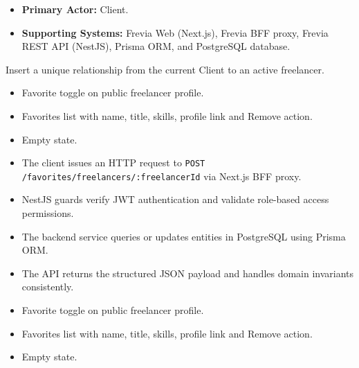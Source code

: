 
\begin{itemize}[leftmargin=1.6em,topsep=3pt,itemsep=2pt,parsep=0pt,label=$\bullet$]
    \item \textbf{Primary Actor:} Client.
    \item \textbf{Supporting Systems:} Frevia Web (Next.js), Frevia BFF proxy, Frevia REST API (NestJS), Prisma ORM, and PostgreSQL database.
\end{itemize}

\noindent Insert a unique relationship from the current Client to an active freelancer.

\begin{itemize}[leftmargin=1.6em,topsep=3pt,itemsep=2pt,parsep=0pt,label=$\bullet$]
    \item Favorite toggle on public freelancer profile.
    \item Favorites list with name, title, skills, profile link and Remove action.
    \item Empty state.
\end{itemize}

\begin{itemize}[leftmargin=1.6em,topsep=3pt,itemsep=2pt,parsep=0pt,label=$\bullet$]
    \item The client issues an HTTP request to \texttt{POST /\allowbreak{}favorites/\allowbreak{}freelancers/\allowbreak{}:\allowbreak{}freelancerId} via Next.js BFF proxy.
    \item NestJS guards verify JWT authentication and validate role-based access permissions.
    \item The backend service queries or updates entities in PostgreSQL using Prisma ORM.
    \item The API returns the structured JSON payload and handles domain invariants consistently.
\end{itemize}

\begin{itemize}[leftmargin=1.6em,topsep=3pt,itemsep=2pt,parsep=0pt,label=$\bullet$]
    \item Favorite toggle on public freelancer profile.
    \item Favorites list with name, title, skills, profile link and Remove action.
    \item Empty state.
\end{itemize}

